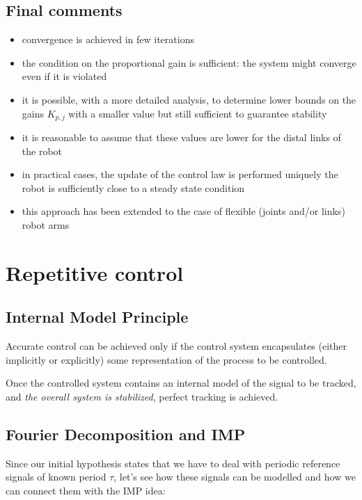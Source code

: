 \documentclass{book}
\begin{document}
\subsection{Final comments}
\begin{itemize}
    \item convergence is achieved in few iterations 
    \item  the condition on the proportional gain is sufficient: the system might converge even if it is violated 
    \item it is possible, with a more detailed analysis, to determine lower bounds on the gains $K_{p,j}$ with a smaller value but still sufficient to guarantee stability 
    \item it is reasonable to assume that these values are lower for the distal links of the robot 
    \item in practical cases, the update of the control law is performed uniquely the robot is sufficiently close to a steady state condition
    \item this approach has been extended to the case of flexible (joints and/or links) robot arms
\end{itemize}


\section{Repetitive control}
\subsection{Internal Model Principle}
Accurate control can be achieved only if the control system encapsulates (either implicitly or explicitly) some representation of the process to be controlled. 

Once the controlled system contains an internal model of the signal to be tracked, and \emph{the overall system is stabilized}, perfect tracking is achieved. 
\subsection{Fourier Decomposition and IMP}
Since our initial hypothesis states that we have to deal with periodic reference signals of known period $\tau$, let's see how these signals can be modelled and how we can connect them with the IMP idea:
\end{document}
